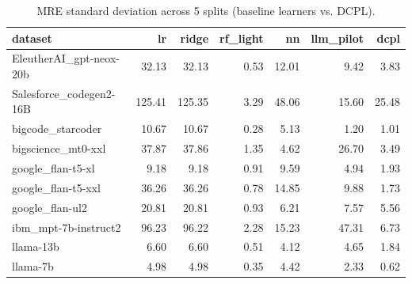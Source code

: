 \begin{table}
\caption{MRE standard deviation across 5 splits (baseline learners vs. DCPL).}
\label{tab:mre_std_baseline_vs_dcpl}
\begin{tabular}{lrrrrrr}
\toprule
dataset & lr & ridge & rf\_light & nn & llm\_pilot & dcpl \\
\midrule
EleutherAI\_gpt-neox-20b & 32.13 & 32.13 & 0.53 & 12.01 & 9.42 & 3.83 \\
Salesforce\_codegen2-16B & 125.41 & 125.35 & 3.29 & 48.06 & 15.60 & 25.48 \\
bigcode\_starcoder & 10.67 & 10.67 & 0.28 & 5.13 & 1.20 & 1.01 \\
bigscience\_mt0-xxl & 37.87 & 37.86 & 1.35 & 4.62 & 26.70 & 3.49 \\
google\_flan-t5-xl & 9.18 & 9.18 & 0.91 & 9.59 & 4.94 & 1.93 \\
google\_flan-t5-xxl & 36.26 & 36.26 & 0.78 & 14.85 & 9.88 & 1.73 \\
google\_flan-ul2 & 20.81 & 20.81 & 0.93 & 6.21 & 7.57 & 5.56 \\
ibm\_mpt-7b-instruct2 & 96.23 & 96.22 & 2.28 & 15.23 & 47.31 & 6.73 \\
llama-13b & 6.60 & 6.60 & 0.51 & 4.12 & 4.65 & 1.84 \\
llama-7b & 4.98 & 4.98 & 0.35 & 4.42 & 2.33 & 0.62 \\
\bottomrule
\end{tabular}
\end{table}
